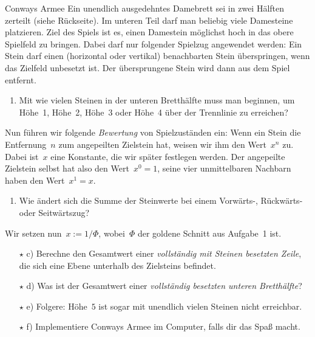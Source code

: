 \documentclass{zirkelblatt}
\begin{document}
\begin{aufgabe}{Conways Armee}
Ein unendlich ausgedehntes Damebrett sei in zwei Hälften zerteilt (siehe
Rückseite). Im unteren Teil darf man beliebig viele Damesteine platzieren. Ziel
des Spiels ist es, einen Damestein möglichst hoch in das obere Spielfeld zu
bringen. Dabei darf nur folgender Spielzug angewendet werden: Ein Stein
darf einen (horizontal oder vertikal) benachbarten Stein überspringen, wenn das
Zielfeld unbesetzt ist. Der übersprungene Stein wird dann aus dem Spiel
entfernt.
\begin{enumerate}
\item Mit wie vielen Steinen in der unteren Bretthälfte muss man beginnen, um
Höhe~1, Höhe~2, Höhe~3 oder Höhe~4 über der Trennlinie zu erreichen?
\end{enumerate}
Nun führen wir folgende \emph{Bewertung} von Spielzuständen ein: Wenn ein Stein die
Entfernung~$n$ zum angepeilten Zielstein hat, weisen wir ihm den Wert~$x^n$ zu.
Dabei ist~$x$ eine Konstante, die wir später festlegen werden.
Der angepeilte Zielstein selbst hat also den Wert~$x^0 = 1$, seine vier
unmittelbaren Nachbarn haben den Wert~$x^1 = x$.
\begin{enumerate}
\addtocounter{enumi}{1}
\item Wie ändert sich die Summe der Steinwerte bei einem Vorwärts-, Rückwärts-
oder Seitwärtszug?
\end{enumerate}
Wir setzen nun~$x := 1/\Phi$, wobei~$\Phi$ der goldene Schnitt aus Aufgabe~1
ist.
\begin{enumerate}
\item[$\star$ c)] Berechne den Gesamtwert einer \emph{vollständig mit
Steinen besetzten Zeile}, die sich eine Ebene unterhalb des Zielsteins befindet.
\item[$\star$ d)] Was ist der Gesamtwert einer \emph{vollständig besetzten unteren Bretthälfte}?
\item[$\star$ e)] Folgere: Höhe~$5$ ist sogar mit unendlich vielen Steinen
nicht erreichbar.
\item[$\star$ f)] Implementiere Conways Armee im Computer, falls dir das Spaß macht.
\end{enumerate}
\end{aufgabe}

\newpage

\newcommand*{\xMin}{0}%
\newcommand*{\xMax}{6}%
\newcommand*{\yMin}{0}%
\newcommand*{\yMax}{6}%
\hspace*{-1.3cm}%
\end{document}
